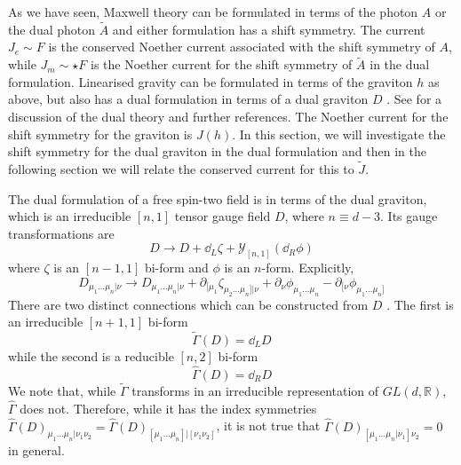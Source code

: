As we have seen, Maxwell theory can be formulated in terms of the photon $A$ or the dual photon $\tilde A$ and either formulation has a shift symmetry. The current $J_e \sim F$ is the conserved Noether current associated with the shift symmetry of $A$, while $J_m \sim \star F$ is the Noether current for the shift symmetry of $\tilde A$ in the dual formulation.
Linearised gravity can be formulated in terms of the graviton $h$ as above, but also has a dual formulation in terms of a dual graviton $D$ \cite{Hull2000, Hull2001DualityFields}. See \cite{HullYetAppear} for a discussion of the dual theory and further references.
The Noether current for the shift symmetry for the graviton is $J(h)$. In this section, we will investigate the shift symmetry for the dual graviton in the dual formulation and then in the following section we will relate the conserved current for this to $\tilde{J}$.

The dual formulation of a free spin-two field is in terms of the dual graviton, which is an irreducible $[n,1]$ tensor gauge field $D$, where $n\equiv d-3$. Its gauge transformations are
\begin{equation}\label{Dgauge}
    D\to D+ \dd_L \zeta + \mathcal{Y}_{[n,1]} \left(\dd_R \phi\right)
\end{equation}
where $\zeta$ is an $[n-1,1]$ bi-form and $\phi$ is an $n$-form. Explicitly, 
\begin{equation}
    D_{\mu_1\dots\mu_n|\nu} \to D_{\mu_1\dots\mu_n|\nu} + \partial_{[\mu_1} \zeta_{\mu_2\dots\mu_n]|\nu} + \partial_\nu \phi_{\mu_1\dots\mu_n} -  \partial_{[\nu} \phi_{\mu_1\dots\mu_n]}
\end{equation}
There are two distinct connections which can be constructed from $D$ \cite{deMedeiros:2003osq}. The first is an irreducible $[n+1,1]$ bi-form
\begin{equation}\label{eq:Gammatilde}
    \tilde{\Gamma}(D) = \dd_L D
\end{equation}
while the second is a reducible $[n,2]$ bi-form
\begin{equation}
    \hat{\Gamma}(D) = \dd_R D
\end{equation}
We note that, while $\tilde{\Gamma}$ transforms in an irreducible representation of $GL(d,\mathbb{R})$, $\hat{\Gamma}$ does not. Therefore, while it has the index symmetries $\hat{\Gamma}(D)_{\mu_1\dots\mu_n|\nu_1\nu_2} = \hat{\Gamma}(D)_{[\mu_1\dots\mu_n]|[\nu_1\nu_2]}$, it is not true that $\hat{\Gamma}(D)_{[\mu_1\dots\mu_n|\nu_1]\nu_2}=0$ in general.

